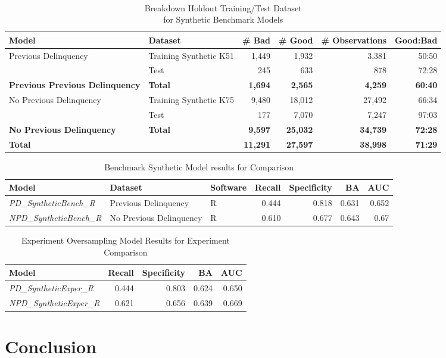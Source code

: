 \begin{table}[H]
	\centering\
	\resizebox{\textwidth}{!}
	{
		\begin{tabular}{l l r r r r}
			\hline
			\textbf{Model} &  \textbf{Dataset} & \textbf{\# Bad} & \textbf{\# Good} & \textbf{\# Observations} & \textbf{Good:Bad} \\
			\hline
			Previous Delinquency & Training Synthetic K51 & 1,449 & 1,932 & 3,381 & 50:50\\
			& Test & 245 & 633 & 878 & 72:28\\\hline
			\textbf{Previous Previous Delinquency}     & \textbf{Total} & \textbf{1,694} & \textbf{2,565} & \textbf{4,259} & \textbf{60:40} \\
			\hline
			No Previous Delinquency & Training Synthetic K75 & 9,480 & 18,012 & 27,492 & 66:34 \\ 
			& Test & 177 & 7,070 & 7,247 & 97:03 	\\\hline
			\textbf{No Previous Delinquency}     & \textbf{Total} & \textbf{9,597} & \textbf{25,032} & \textbf{34,739} & \textbf{72:28} \\
			\hline
			\textbf{Total } 	&     	     & \textbf{11,291} & \textbf{27,597} & \textbf{38,998} & \textbf{71:29}\\ \hline
		\end{tabular}
	}
	\caption{Breakdown Holdout Training/Test Dataset \\for Synthetic Benchmark Models}
	\label{table:benchmark_holdout_Synthetic_train_test}
\end{table}


\begin{table}[H]
	\centering
	\resizebox{\textwidth}{!}
	{
		\begin{tabular}{l l l r r r r}
			\hline
			\textbf{Model} & \textbf{Dataset} & \textbf{Software} & \textbf{Recall} & \textbf{Specificity} & \textbf{BA} & \textbf{AUC}  \\ \hline
			\textit{PD\_SyntheticBench\_R} & Previous Delinquency & R & 0.444 & 0.818 & 0.631 & 0.652   \\ \hline
			\textit{NPD\_SyntheticBench\_R} & No Previous Delinquency & R & 0.610 & 0.677 & 0.643 & 0.67   \\ \hline
		\end{tabular}
	}
	\caption{Benchmark Synthetic Model results for Comparison}
	\label{table:benchmodelSynthetic}
\end{table}

\begin{table}[H]
	\centering
	\small
	\begin{tabular}{l  r r r r}
		\hline
		\textbf{Model} & \textbf{Recall} & \textbf{Specificity} & \textbf{BA} & \textbf{AUC}  \\ \hline
		\textit{PD\_SyntheticExper\_R}  & 0.444 & 0.803 & 0.624 & 0.650   \\ \hline
		\textit{NPD\_SyntheticExper\_R} & 0.621 & 0.656 & 0.639 & 0.669   \\ \hline
	\end{tabular}
	\caption{Experiment Oversampling Model Results for Experiment Comparison}
	\label{table:benchmodelSyntheticExper}
\end{table}



\section{Conclusion}